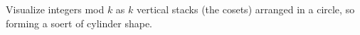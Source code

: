 Visualize integers mod $k$ as $k$ vertical stacks (the cosets) arranged in a circle, so forming a soert of cylinder shape.